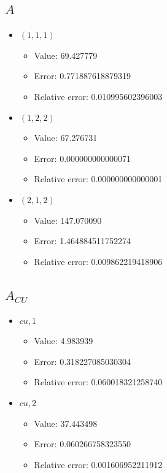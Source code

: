 \documentclass{article}%
\begin{document}
\subsection{$A$}%
\begin{itemize}%
	\item $(1, 1, 1)$%
	\begin{itemize}%
		\item Value: 69.427779%
		\item Error: 0.771887618879319%
		\item Relative error: 0.010995602396003%
	\end{itemize}%
	\item $(1, 2, 2)$%
	\begin{itemize}%
		\item Value: 67.276731%
		\item Error: 0.000000000000071%
		\item Relative error: 0.000000000000001%
	\end{itemize}%
	\item $(2, 1, 2)$%
	\begin{itemize}%
		\item Value: 147.070090%
		\item Error: 1.464884511752274%
		\item Relative error: 0.009862219418906%
	\end{itemize}%
\end{itemize}%
\subsection{$A_{CU}$}%
\begin{itemize}%
	\item $\textit{cu},1$%
	\begin{itemize}%
		\item Value: 4.983939%
		\item Error: 0.318227085030304%
		\item Relative error: 0.060018321258740%
	\end{itemize}%
	\item $\textit{cu},2$%
	\begin{itemize}%
		\item Value: 37.443498%
		\item Error: 0.060266758323550%
		\item Relative error: 0.001606952211912%
	\end{itemize}%
\end{itemize}%
\end{document}
